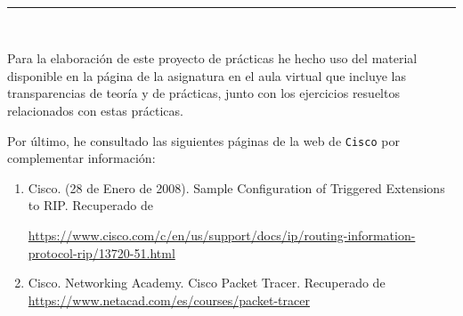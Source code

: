  \begin{center}
	{\fboxrule=4pt } \\
	\rule{15cm}{0pt} \\
\end{center}
\par Para la elaboración de este proyecto de prácticas he hecho uso del material disponible en la página de la asignatura en el aula virtual que incluye las transparencias de teoría y de prácticas, junto con los ejercicios resueltos relacionados con estas prácticas.
\par Por último, he consultado las siguientes páginas de la web de \texttt{Cisco} por complementar información:
\begin{enumerate}
	\item Cisco. (28 de Enero de 2008). Sample Configuration of Triggered Extensions to RIP. Recuperado de 
	\raggedright\url{https://www.cisco.com/c/en/us/support/docs/ip/routing-information-protocol-rip/13720-51.html}
	\item Cisco. Networking Academy. Cisco Packet Tracer. Recuperado de 
	\url{https://www.netacad.com/es/courses/packet-tracer}
\end{enumerate}

